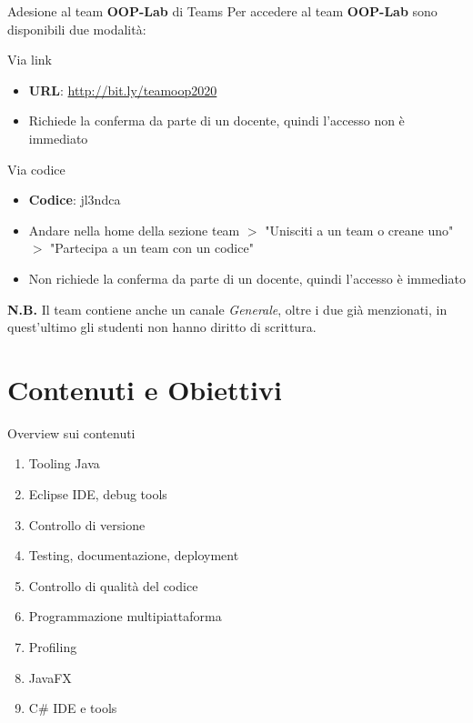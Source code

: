 \documentclass[presentation]{beamer}
\begin{document}
\begin{frame}{Adesione al team \textbf{OOP-Lab} di Teams}
    Per accedere al team \textbf{OOP-Lab} sono disponibili due modalità:
    \begin{block}{Via link}
        \begin{itemize}
            \item \textbf{URL}: \url{http://bit.ly/teamoop2020}
            \item Richiede la conferma da parte di un docente, quindi l'accesso non è immediato
        \end{itemize}
    \end{block}
    \begin{block}{Via codice}
        \begin{itemize}
            \item \textbf{Codice}: jl3ndca
            \item Andare nella home della sezione team $>$ "Unisciti a un team o creane uno" $>$ "Partecipa a un team con un codice"
	    \item Non richiede la conferma da parte di un docente, quindi l'accesso è immediato
        \end{itemize}
    \end{block}
    \textbf{N.B.} Il team contiene anche un canale \textit{Generale}, oltre i due già menzionati, in quest'ultimo gli studenti non hanno diritto di scrittura.
\end{frame}


\section{Contenuti e Obiettivi}

\begin{frame}{Overview sui contenuti}

\begin{enumerate}
    \item Tooling Java
    \item Eclipse IDE, debug tools
    \item Controllo di versione
    \item Testing, documentazione, deployment
    \item Controllo di qualità del codice
    \item Programmazione multipiattaforma
    \item Profiling
    \item JavaFX
    \item C\# IDE e tools
\end{enumerate}

\end{frame}
\end{document}

